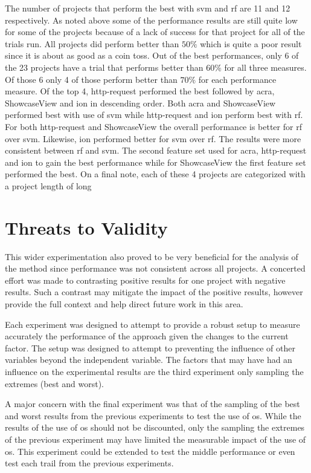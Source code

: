 The number of projects that perform the best with \gls{svm} and \gls{rf} are 11 and 12 respectively. As noted above some of the performance results are still quite low for some of the projects because of a lack of success for that project for all of the trials run. All projects did perform better than $50\%$ which is quite a poor result since it is about as good as a coin toss. Out of the best performances, only 6 of the 23 projects have a trial that performs better than $60\%$ for all three measures. Of those 6 only 4 of those perform better than $70\%$ for each performance measure. Of the top 4, http-request performed the best followed by acra, ShowcaseView and ion in descending order. Both acra and ShowcaseView performed best with use of \gls{svm} while http-request and ion perform best with \gls{rf}. For both http-request and ShowcaseView the overall performance is better for \gls{rf} over \gls{svm}. Likewise, ion performed better for \gls{svm} over \gls{rf}. The results were more consistent between \gls{rf} and \gls{svm}. The second feature set used for acra, http-request and ion to gain the best performance while for ShowcaseView the first feature set performed the best. On a final note, each of these 4 projects are categorized with a project length of long 
 
\clearpage
\section{Threats to Validity}
\label{sec:threat_validity}

This wider experimentation also proved to be very beneficial for the analysis of the method since performance was not consistent across all projects. A concerted effort was made to contrasting positive results for one project with negative results. Such a contrast may mitigate the impact of the positive results, however provide the full context and help direct future work in this area.

Each experiment was designed to attempt to provide a robust setup to measure accurately the performance of the approach given the changes to the current factor. The setup was designed to attempt to preventing the influence of other variables beyond the independent variable. The factors that may have had an influence on the experimental results are the third experiment only sampling the extremes (best and worst).

A major concern with the final experiment was that of the sampling of the best and worst results from the previous experiments to test the use of \gls{os}. While the results of the use of \gls{os} should not be discounted, only the sampling the extremes of the previous experiment may have limited the measurable impact of the use of \gls{os}. This experiment could be extended to test the middle performance or even test each trail from the previous experiments.


